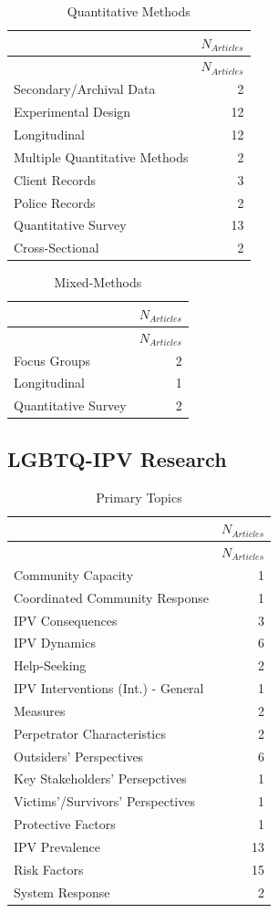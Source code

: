\documentclass[]{tufte-handout}
\begin{document}
\begin{longtable}[]{@{}lr@{}}
\caption{Quantitative Methods}\tabularnewline
\toprule
& \(N_{Articles}\)\tabularnewline
\midrule
\endfirsthead
\toprule
& \(N_{Articles}\)\tabularnewline
\midrule
\endhead
Secondary/Archival Data & 2\tabularnewline
Experimental Design & 12\tabularnewline
Longitudinal & 12\tabularnewline
Multiple Quantitative Methods & 2\tabularnewline
Client Records & 3\tabularnewline
Police Records & 2\tabularnewline
Quantitative Survey & 13\tabularnewline
Cross-Sectional & 2\tabularnewline
\bottomrule
\end{longtable}

\begin{longtable}[]{@{}lr@{}}
\caption{Mixed-Methods}\tabularnewline
\toprule
& \(N_{Articles}\)\tabularnewline
\midrule
\endfirsthead
\toprule
& \(N_{Articles}\)\tabularnewline
\midrule
\endhead
Focus Groups & 2\tabularnewline
Longitudinal & 1\tabularnewline
Quantitative Survey & 2\tabularnewline
\bottomrule
\end{longtable}

\newpage

\subsection{LGBTQ-IPV Research}\label{lgbtq-ipv-research}

\begin{longtable}[]{@{}lr@{}}
\caption{Primary Topics}\tabularnewline
\toprule
& \(N_{Articles}\)\tabularnewline
\midrule
\endfirsthead
\toprule
& \(N_{Articles}\)\tabularnewline
\midrule
\endhead
Community Capacity & 1\tabularnewline
Coordinated Community Response & 1\tabularnewline
IPV Consequences & 3\tabularnewline
IPV Dynamics & 6\tabularnewline
Help-Seeking & 2\tabularnewline
IPV Interventions (Int.) - General & 1\tabularnewline
Measures & 2\tabularnewline
Perpetrator Characteristics & 2\tabularnewline
Outsiders' Perspectives & 6\tabularnewline
Key Stakeholders' Persepctives & 1\tabularnewline
Victims'/Survivors' Perspectives & 1\tabularnewline
Protective Factors & 1\tabularnewline
IPV Prevalence & 13\tabularnewline
Risk Factors & 15\tabularnewline
System Response & 2\tabularnewline
\bottomrule
\end{longtable}
\end{document}
